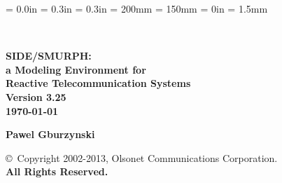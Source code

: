 \newcommand{\references}[1]{%
}%

\newenvironment{doublespace}%
{\renewcommand{\baselinestretch}{1.50} \large \normalsize}%
{\renewcommand{\baselinestretch}{1} \large \normalsize}%

\newenvironment{singlespace}%
{\renewcommand{\baselinestretch}{1} \large \normalsize}%
{\renewcommand{\baselinestretch}{1.50} \large \normalsize}%

\newcommand{\lansf}{{\sc LANSF}}
\newcommand{\smurph}{{\sc SIDE}}
\newcommand{\dsd}{{\sc DSD}}
\newcommand{\smurphtt}{{\tt SIDE}}
\newcommand{\smurphrm}{{SIDE}}
\newcommand{\smurphtts}{{\tt side}}
\newcommand{\serdel}{{\sc SERDEL}}
\newcommand{\djgpp}{{\sc DJGPP}}

\topmargin = 0.0in
\oddsidemargin = 0.3in
\evensidemargin = 0.3in
\textheight = 200mm
\textwidth = 150mm
\parindent = 0in
\parskip = 1.5mm

\sloppy



\begin{titlepage}

\vspace*{0.35in}

\begin{center}

 \\

\vspace*{0.45in}

\Huge\bf SIDE/SMURPH:\vspace{0.1in} \\

\huge\bf a Modeling Environment for\vspace{0.1in} \\

Reactive Telecommunication Systems\vspace{0.25in}\\

\Large Version 3.25 \\

\large {\today} \\

\vspace{1.1in}

\bf Pawel Gburzynski \\

\vspace*{1.5in}

{\Large {\copyright}~Copyright 2002-2013, Olsonet Communications Corporation.\\
{\bf All Rights Reserved.}}

\normalsize

\end{center}

\end{titlepage}

